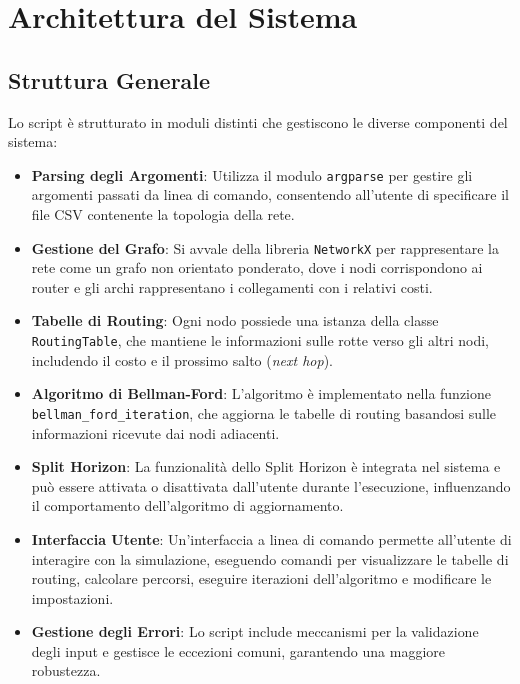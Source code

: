 \documentclass[a4paper,12pt]{article}
\begin{document}
	\section{Architettura del Sistema}
	
	\subsection{Struttura Generale}
	
	Lo script è strutturato in moduli distinti che gestiscono le diverse componenti del sistema:
	
	\begin{itemize}
		\item \textbf{Parsing degli Argomenti}: Utilizza il modulo \texttt{argparse} per gestire gli argomenti passati da linea di comando, consentendo all'utente di specificare il file CSV contenente la topologia della rete.
		\item \textbf{Gestione del Grafo}: Si avvale della libreria \texttt{NetworkX} per rappresentare la rete come un grafo non orientato ponderato, dove i nodi corrispondono ai router e gli archi rappresentano i collegamenti con i relativi costi.
		\item \textbf{Tabelle di Routing}: Ogni nodo possiede una istanza della classe \texttt{RoutingTable}, che mantiene le informazioni sulle rotte verso gli altri nodi, includendo il costo e il prossimo salto (\textit{next hop}).
		\item \textbf{Algoritmo di Bellman-Ford}: L'algoritmo è implementato nella funzione \texttt{bellman\_ford\_iteration}, che aggiorna le tabelle di routing basandosi sulle informazioni ricevute dai nodi adiacenti.
		\item \textbf{Split Horizon}: La funzionalità dello Split Horizon è integrata nel sistema e può essere attivata o disattivata dall'utente durante l'esecuzione, influenzando il comportamento dell'algoritmo di aggiornamento.
		\item \textbf{Interfaccia Utente}: Un'interfaccia a linea di comando permette all'utente di interagire con la simulazione, eseguendo comandi per visualizzare le tabelle di routing, calcolare percorsi, eseguire iterazioni dell'algoritmo e modificare le impostazioni.
		\item \textbf{Gestione degli Errori}: Lo script include meccanismi per la validazione degli input e gestisce le eccezioni comuni, garantendo una maggiore robustezza.
	\end{itemize}
	
\end{document}
